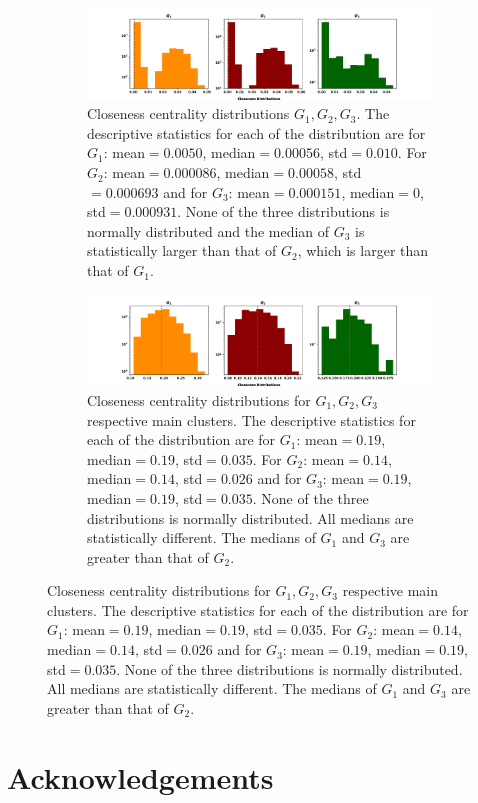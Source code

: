\documentclass{article}
\theoremstyle{definition}
\begin{document}
\begin{figure}[!hbtp]
    \centering
    \begin{subfigure}{\textwidth}\centering
    \includegraphics[width=\textwidth]{./assets/images/closeness_distributions.pdf}
    \caption{Closeness centrality distributions \(G_1, G_2, G_3\). The descriptive
        statistics for each of the distribution are for \(G_1\): mean\(=0.0050\),
        median\(=0.00056\), std\(=0.010\). For \(G_2\): mean\(=0.000086\), median\(=0.00058\),
        std\(=0.000693\) and for \(G_3\): mean\(=0.000151\), median\(=0\), std\(=0.000931\).
        None of the three distributions is normally distributed and the median
        of \(G_3\) is statistically larger than that of \(G_2\), which is
        larger than that of \(G_1\).}\label{fig:closeness_dist}
\end{subfigure}
\begin{subfigure}{\textwidth}\centering
    \centering
    \includegraphics[width=\textwidth]{./assets/images/closeness_distributions_clusters.pdf}
    \caption{Closeness centrality distributions for \(G_1, G_2, G_3\) respective
    main clusters. The descriptive statistics for each of the distribution are
    for \(G_1\): mean\(=0.19\),
    median\(=0.19\), std\(=0.035\). For \(G_2\): mean\(=0.14\), median\(=0.14\),
    std\(=0.026\) and for \(G_3\): mean\(=0.19\), median\(=0.19\), std\(=0.035\).
    None of the three distributions is normally distributed. All medians
    are statistically different. The medians of \(G_1\) and \(G_3\) are greater
    than that of \(G_2\).}\label{fig:closeness_dist_cluster}
    \end{subfigure}
\end{figure}

\section{Acknowledgements}
\end{document}
